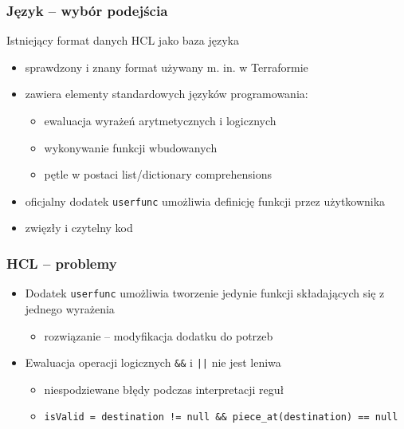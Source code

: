 \documentclass{beamer}
\begin{document}
\begin{frame}
	\frametitle{Język -- wybór podejścia}
	Istniejący format danych HCL jako baza języka
	\begin{itemize}
		\item sprawdzony i znany format używany m. in. w Terraformie\footnotemark
		\item zawiera elementy standardowych języków programowania:
		      \begin{itemize}
			      \item ewaluacja wyrażeń arytmetycznych i logicznych
			      \item wykonywanie funkcji wbudowanych
			      \item pętle w postaci list/dictionary comprehensions
		      \end{itemize}
		\item oficjalny dodatek {\tt userfunc} umożliwia definicję funkcji przez użytkownika
		\item zwięzły i czytelny kod
	\end{itemize}
\end{frame}

\begin{frame}
	\frametitle{HCL -- problemy}
	\begin{itemize}
		\item Dodatek {\tt userfunc} umożliwia tworzenie jedynie funkcji składających się z jednego wyrażenia
		      \begin{itemize}
			      \item rozwiązanie -- modyfikacja dodatku do potrzeb
		      \end{itemize}
		\item Ewaluacja operacji logicznych {\tt \&\&} i {\tt ||} nie jest leniwa
		      \begin{itemize}
			      \item niespodziewane błędy podczas interpretacji reguł
			      \item \lstinline|isValid = destination != null && piece_at(destination) == null|
		      \end{itemize}
	\end{itemize}
\end{frame}
\end{document}
